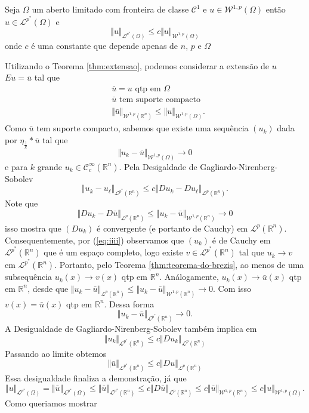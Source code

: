 \documentclass[a4paper, 11pt]{book}
\theoremstyle{definition}
\newcommand{\bR}{\mathbb{R}}
\newcommand{\cC}{\mathcal{C}}
\newcommand{\cL}{\mathcal{L}}
\newcommand{\cW}{\mathcal{W}}
\begin{document}
\begin{tbox} \label{thm:desigualdade-teorema-2}
    Seja $\Omega$ um aberto limitado com fronteira de classe $\cC^1$ e $u \in \cW^{1,p}(\Omega)$ então $u \in \cL^{p^*}(\Omega)$ e
    \[
        \Vert u \Vert_{\cL^{p^*}(\Omega)} \leqslant c \Vert u \Vert_{\cW^{1,p}(\Omega)}
    \]
    onde $c$ é uma constante que depende apenas de $n$, $p$ e $\Omega$
\end{tbox}
\begin{prf}
    Utilizando o Teorema \ref{thm:extensao}, podemos considerar a extensão de $u$ $Eu = \bar u$ tal que
    \[
        \begin{aligned}
            &\bar u = u \text{ qtp em } \Omega\\
            &\bar u \text{ tem suporte compacto}\\
            &\Vert \bar u \Vert_{\cW^{1,p}(\bR^n)} \leqslant \Vert u \Vert_{\cW^{1,p}(\Omega)}.
        \end{aligned}
    \]
    Como $\bar u$ tem suporte compacto, sabemos que existe uma sequência $(u_k)$ dada por $\eta_{\frac{1}{k}} * \bar u$ tal que
    \[
        \Vert u_k - \bar u \Vert_{\cW^{1,p}(\Omega)} \to 0
    \]
    e para $k$ grande $u_k \in \cC^{\infty}_c(\bR^n)$.
    Pela Desigaldade de Gagliardo-Nirenberg-Sobolev
    \begin{equation} \label{eq:iiii}
        \Vert u_k - u_\ell \Vert_{\cL^{p^*}(\bR^n)} \leqslant c \Vert Du_k - Du_\ell \Vert_{\cL^p(\bR^n)}.
    \end{equation}
    Note que
    \[
        \Vert Du_k - D\bar u \Vert_{\cL^p(\bR^n)} \leqslant \Vert u_k - \bar u \Vert_{\cW^{1,p}(\bR^n)} \to 0
    \]
    isso mostra que $(Du_k)$ é convergente (e portanto de Cauchy) em $\cL^p(\bR^n)$.
    Consequentemente, por (\ref{eq:iiii}) observamos que $(u_k)$ é de Cauchy em $\cL^{p^*}(\bR^n)$ que é um espaço completo, logo existe $v \in \cL^{p^*}(\bR^n)$ tal que $u_k \to v$ em $\cL^{p^*}(\bR^n)$. Portanto, pelo Teorema \ref{thm:teorema-do-brezis}, ao menos de uma subsequência $u_k(x) \to v(x)$ qtp em $\bR^n$. Análogamente, $u_k(x) \to \bar u(x)$ qtp em $\bR^n$, desde que $\Vert u_k - \bar u \Vert_{\cL^p(\bR^n)} \leqslant \Vert u_k - \bar u \Vert_{\cW^{1,p}(\bR^n)} \to 0$. Com isso $v(x) = \bar u(x)$ qtp em $\bR^n$.
    Dessa forma
    \[
        \Vert u_k - \bar u \Vert_{\cL^{p^*}(\bR^n)} \to 0.
    \]
    A Desigualdade de Gagliardo-Nirenberg-Sobolev também implica em
    \[  
        \Vert u_k \Vert_{\cL^{p^*}(\bR^n)} \leqslant c \Vert Du_k \Vert_{\cL^p(\bR^n)}
    \]
    Passando ao limite obtemos
    \[
        \Vert \bar u \Vert_{\cL^{p^*}(\bR^n)} \leqslant c \Vert D u \Vert_{\cL^p(\bR^n)}
    \]
    Essa desigualdade finaliza a demonstração, já que
    \[
        \Vert u \Vert_{\cL^{p^*}(\Omega)} = \Vert \bar u \Vert_{\cL^{p^*}(\Omega)} \leqslant \Vert \bar u \Vert_{\cL^{p^*}(\bR^n)} \leqslant c \Vert D \bar u \Vert_{\cL^p(\bR^n)} \leqslant c \Vert \bar u \Vert_{\cW^{1,p}(\bR^n)} \leqslant c \Vert u \Vert_{\cW^{1,p}(\Omega)}.
    \]
    Como queriamos mostrar
\end{prf}
\end{document}

